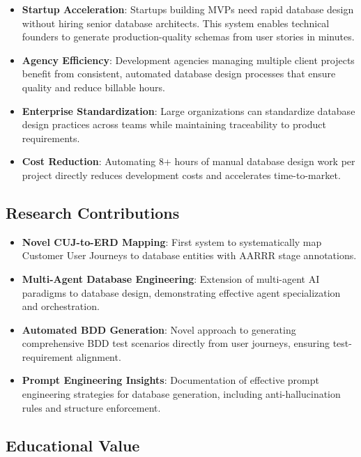 \documentclass[12pt,a4paper]{article}
\begin{document}
\begin{itemize}
\item \textbf{Startup Acceleration}: Startups building MVPs need rapid database design without hiring senior database architects. This system enables technical founders to generate production-quality schemas from user stories in minutes.

\item \textbf{Agency Efficiency}: Development agencies managing multiple client projects benefit from consistent, automated database design processes that ensure quality and reduce billable hours.

\item \textbf{Enterprise Standardization}: Large organizations can standardize database design practices across teams while maintaining traceability to product requirements.

\item \textbf{Cost Reduction}: Automating 8+ hours of manual database design work per project directly reduces development costs and accelerates time-to-market.
\end{itemize}

\subsection{Research Contributions}

\begin{itemize}
\item \textbf{Novel CUJ-to-ERD Mapping}: First system to systematically map Customer User Journeys to database entities with AARRR stage annotations.

\item \textbf{Multi-Agent Database Engineering}: Extension of multi-agent AI paradigms to database design, demonstrating effective agent specialization and orchestration.

\item \textbf{Automated BDD Generation}: Novel approach to generating comprehensive BDD test scenarios directly from user journeys, ensuring test-requirement alignment.

\item \textbf{Prompt Engineering Insights}: Documentation of effective prompt engineering strategies for database generation, including anti-hallucination rules and structure enforcement.
\end{itemize}

\subsection{Educational Value}
\end{document}
